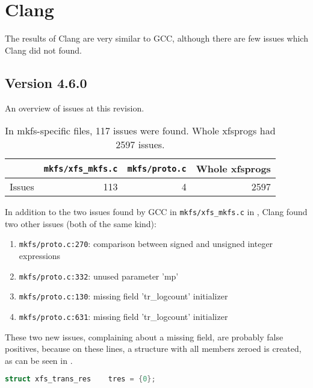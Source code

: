\section{Clang}\label{chap:results:clang}
The results of Clang are very similar to GCC, although there are few issues
which Clang did not found.

\subsection{Version 4.6.0}\label{chap:results:clang:4.6}

An overview of issues at this revision.
\begin{table}[h]
\begin{tabular}{|l||r|r||r|}
\hline
& {\tt mkfs/xfs\_mkfs.c} & {\tt mkfs/proto.c} & Whole xfsprogs \\
\hline
Issues & 113 & 4 & 2597 \\
\hline
\end{tabular}
\caption{In mkfs-specific files, 117 issues were found. Whole
xfsprogs had 2597 issues.}
\end{table}

In addition to the two issues found by GCC in {\tt mkfs/xfs\_mkfs.c} in , Clang found two other issues (both of the same kind):
\begin{enumerate}
	\item {\tt mkfs/proto.c:270}: comparison between signed and unsigned integer expressions
	\item {\tt mkfs/proto.c:332}: unused parameter 'mp'
	\item {\tt mkfs/proto.c:130}: missing field 'tr\_logcount' initializer
	\item {\tt mkfs/proto.c:631}: missing field 'tr\_logcount' initializer
\end{enumerate}

These two new issues, complaining about a missing field, are probably false
positives, because on these lines, a structure with all members zeroed is
created, as can be seen in .


\begin{lstlisting}[frame=none, basicstyle=\footnotesize\ttfamily,
language=C, numbers=none, numberstyle=\tiny\color{black},caption=
{One of the two lines on which Clang reports a missing field in structure
initialization.},
label={lst:results:zeroedStruct}]
struct xfs_trans_res    tres = {0};
\end{lstlisting}

